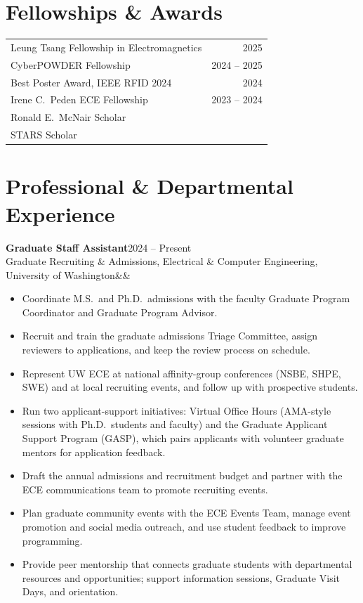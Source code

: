 \documentclass[11pt,letterpaper]{article}
\newcommand{\cventry}[4]{%
  \textbf{#1}\hfill #2\\
  #3\ifx&#4&\else\\ \textit{#4}\fi\par\vspace{2pt}}
\begin{document}
\section{Fellowships \& Awards}
\begin{tabular}{@{}p{}@{}r@{}}
  Leung Tsang Fellowship in Electromagnetics & 2025 \\
  CyberPOWDER Fellowship & 2024 -- 2025 \\
  Best Poster Award, IEEE RFID 2024 & 2024 \\
  Irene C.\ Peden ECE Fellowship & 2023 -- 2024 \\
  Ronald E.\ McNair Scholar & \\
  STARS Scholar & \\
\end{tabular}

\section{Professional \& Departmental Experience}
\cventry{Graduate Staff Assistant}{2024 -- Present}
        {Graduate Recruiting \& Admissions, Electrical \& Computer Engineering, University of Washington}{}
\begin{itemize}
  \item Coordinate M.S.\ and Ph.D.\ admissions with the faculty Graduate Program Coordinator and Graduate Program Advisor.
  \item Recruit and train the graduate admissions Triage Committee, assign reviewers to applications, and keep the review process on schedule.
  \item Represent UW ECE at national affinity-group conferences (NSBE, SHPE, SWE) and at local recruiting events, and follow up with prospective students.
  \item Run two applicant-support initiatives: Virtual Office Hours (AMA-style sessions with Ph.D.\ students and faculty) and the Graduate Applicant Support Program (GASP), which pairs applicants with volunteer graduate mentors for application feedback.
  \item Draft the annual admissions and recruitment budget and partner with the ECE communications team to promote recruiting events.
  \item Plan graduate community events with the ECE Events Team, manage event promotion and social media outreach, and use student feedback to improve programming.
  \item Provide peer mentorship that connects graduate students with departmental resources and opportunities; support information sessions, Graduate Visit Days, and orientation.
\end{itemize}
\end{document}
